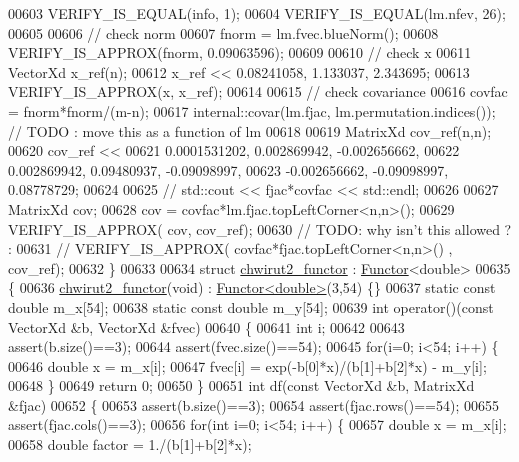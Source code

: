 \begin{DoxyCode}
00603   VERIFY\_IS\_EQUAL(info, 1);
00604   VERIFY\_IS\_EQUAL(lm.nfev, 26);
00605 
00606   \textcolor{comment}{// check norm}
00607   fnorm = lm.fvec.blueNorm();
00608   VERIFY\_IS\_APPROX(fnorm, 0.09063596);
00609 
00610   \textcolor{comment}{// check x}
00611   VectorXd x\_ref(n);
00612   x\_ref << 0.08241058, 1.133037, 2.343695;
00613   VERIFY\_IS\_APPROX(x, x\_ref);
00614 
00615   \textcolor{comment}{// check covariance}
00616   covfac = fnorm*fnorm/(m-n);
00617   internal::covar(lm.fjac, lm.permutation.indices()); \textcolor{comment}{// TODO : move this as a function of lm}
00618 
00619   MatrixXd cov\_ref(n,n);
00620   cov\_ref <<
00621       0.0001531202,   0.002869942,  -0.002656662,
00622       0.002869942,    0.09480937,   -0.09098997,
00623       -0.002656662,   -0.09098997,    0.08778729;
00624 
00625 \textcolor{comment}{//  std::cout << fjac*covfac << std::endl;}
00626 
00627   MatrixXd cov;
00628   cov =  covfac*lm.fjac.topLeftCorner<n,n>();
00629   VERIFY\_IS\_APPROX( cov, cov\_ref);
00630   \textcolor{comment}{// TODO: why isn't this allowed ? :}
00631   \textcolor{comment}{// VERIFY\_IS\_APPROX( covfac*fjac.topLeftCorner<n,n>() , cov\_ref);}
00632 \}
00633 
00634 \textcolor{keyword}{struct }\hyperlink{structchwirut2__functor}{chwirut2\_functor} : \hyperlink{struct_functor}{Functor}<double>
00635 \{
00636     \hyperlink{structchwirut2__functor}{chwirut2\_functor}(\textcolor{keywordtype}{void}) : \hyperlink{struct_functor}{Functor<double>}(3,54) \{\}
00637     \textcolor{keyword}{static} \textcolor{keyword}{const} \textcolor{keywordtype}{double} m\_x[54];
00638     \textcolor{keyword}{static} \textcolor{keyword}{const} \textcolor{keywordtype}{double} m\_y[54];
00639     \textcolor{keywordtype}{int} operator()(\textcolor{keyword}{const} VectorXd &b, VectorXd &fvec)
00640     \{
00641         \textcolor{keywordtype}{int} i;
00642 
00643         assert(b.size()==3);
00644         assert(fvec.size()==54);
00645         \textcolor{keywordflow}{for}(i=0; i<54; i++) \{
00646             \textcolor{keywordtype}{double} x = m\_x[i];
00647             fvec[i] = exp(-b[0]*x)/(b[1]+b[2]*x) - m\_y[i];
00648         \}
00649         \textcolor{keywordflow}{return} 0;
00650     \}
00651     \textcolor{keywordtype}{int} df(\textcolor{keyword}{const} VectorXd &b, MatrixXd &fjac)
00652     \{
00653         assert(b.size()==3);
00654         assert(fjac.rows()==54);
00655         assert(fjac.cols()==3);
00656         \textcolor{keywordflow}{for}(\textcolor{keywordtype}{int} i=0; i<54; i++) \{
00657             \textcolor{keywordtype}{double} x = m\_x[i];
00658             \textcolor{keywordtype}{double} factor = 1./(b[1]+b[2]*x);

\end{DoxyCode}
